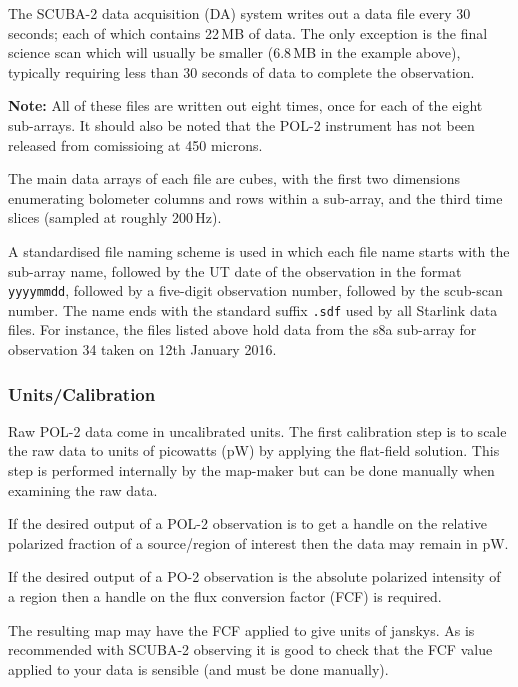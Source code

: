 The SCUBA-2 data acquisition (DA) system writes out a data file every
30 seconds; each of which contains 22\,MB of data. The only exception
is the final science scan which will usually be smaller (6.8\,MB in
the example above), typically requiring less than 30 seconds of data
to complete the observation.

\textbf{Note:} All of these files are written out eight times, once
for each of the eight sub-arrays. It should also be noted that the POL-2 instrument has not 
been released from comissioing at 450 microns.

The main data arrays of each file are cubes, with the first two
dimensions enumerating bolometer columns and rows within a sub-array,
and the third time slices (sampled at roughly 200\,Hz).

A standardised file naming scheme is used in which each file name starts
with the sub-array name, followed by the UT date of the observation in
the format \texttt{yyyymmdd}, followed by a five-digit observation
number, followed by the scub-scan number. The name ends with the standard
suffix \texttt{.sdf} used by all Starlink data files. For instance, the files
listed above hold data from the s8a sub-array for observation 34 taken on
12th January 2016.




\subsubsection*{Units/Calibration}

Raw POL-2 data come in uncalibrated units. The first calibration
step is to scale the raw data to units of picowatts (pW)
by applying the flat-field solution. This step is performed internally
by the map-maker but can be done manually when examining the raw
data.

If the desired output of a POL-2 observation is to get a handle on the relative
polarized fraction of a source/region of interest then the data may remain in
pW.

If the desired output of a PO-2 observation is the absolute polarized intensity
of a region then a handle on the flux conversion factor (FCF) is required.

The resulting map may have the FCF applied to give units of janskys. As is 
recommended with SCUBA-2 observing it is good to check that the FCF value 
applied to your data is sensible (and must be done manually).





